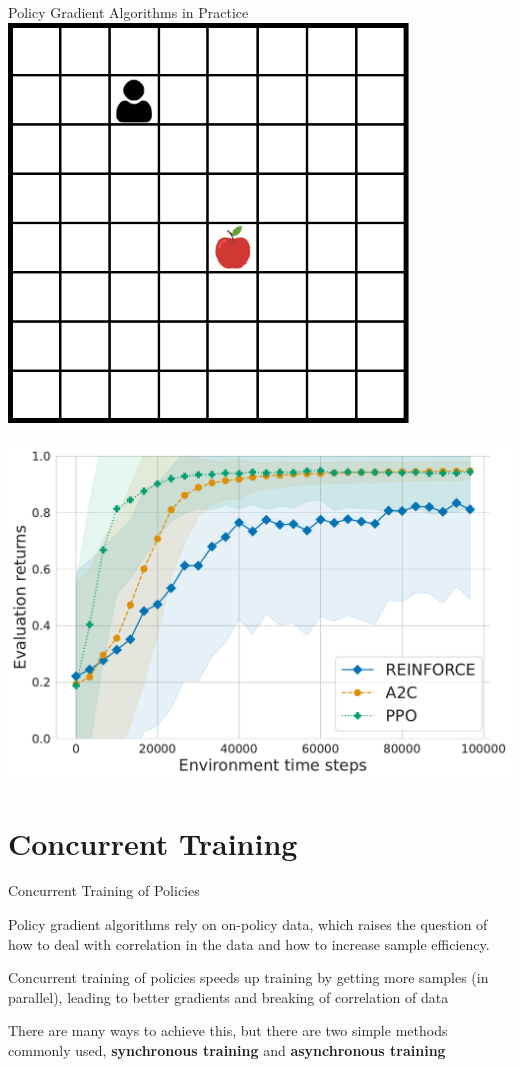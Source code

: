 \begin{frame}{Policy Gradient Algorithms in Practice}
	\bcol
    		\includegraphics[width=0.8\textwidth]{images/chapter_8/single_agent_lbf_nolevel.pdf}

		    \includegraphics[width=1\textwidth]{images/chapter_8/pg_lbf_returns.pdf} 
    \ecol
\end{frame}

\section{Concurrent Training}

\begin{frame}{Concurrent Training of Policies}

Policy gradient algorithms rely on on-policy data, which raises the question of how to deal with correlation in the data and how to increase sample efficiency. 

\blist
    \item Concurrent training of policies speeds up training by getting more samples (in parallel), leading to better gradients and breaking of correlation of data
    \item There are many ways to achieve this, but there are two simple methods commonly used, \textbf{synchronous training} and \textbf{asynchronous training}
\elist
    
\end{frame}

